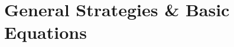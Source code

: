 \documentclass[../satmath.tex]{subfiles}
\begin{document}
\chapter{General Strategies \& Basic Equations}
\end{document}
